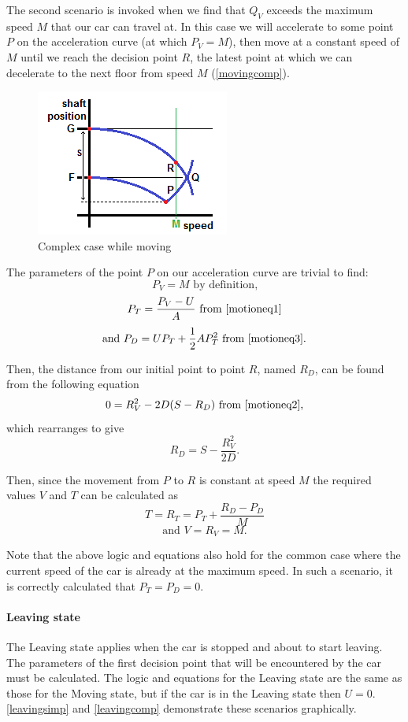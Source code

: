 \documentclass{UoYCSproject}
\begin{document}
The second scenario is invoked when we find that $Q_V$ exceeds the maximum speed $M$ that our car can travel at.  In this case we will accelerate to some point $P$ on the acceleration curve (at which $P_V=M$), then move at a constant speed of $M$ until we reach the decision point $R$, the latest point at which we can decelerate to the next floor from speed $M$ (\autoref{movingcomp}).

\begin{figure} [h]
	\centering
	\includegraphics{moving_comp.png}
	\caption{Complex case while moving}
	\label{movingcomp}
\end{figure}

The parameters of the point $P$ on our acceleration curve are trivial to find:
\[ P_V=M \text{ by definition,} \]
\[ P_T=\frac{P_V-U}{A} \text{ from \autoref{motioneq1}} \]
\[ \text{and } P_D=UP_T+\frac{1}{2}AP_T^2 \text{ from \autoref{motioneq3}.} \]

Then, the distance from our initial point to point $R$, named $R_D$, can be found from the following equation
\[ 0=R_V^2-2D(S-R_D) \text{ from \autoref{motioneq2},} \]
which rearranges to give
\[ R_D = S - \frac{R_V^2}{2D} \text{.} \]

Then, since the movement from $P$ to $R$ is constant at speed $M$ the required values $V$ and $T$ can be calculated as
\[ T = R_T = P_T+\frac{R_D-P_D}{M} \]
\[ \text{and } V = R_V = M \text{.} \]

Note that the above logic and equations also hold for the common case where the current speed of the car is already at the maximum speed.  In such a scenario, it is correctly calculated that $P_T=P_D=0$.

\paragraph{Leaving state}

The Leaving state applies when the car is stopped and about to start leaving.  The parameters of the first decision point that will be encountered by the car must be calculated.  The logic and equations for the Leaving state are the same as those for the Moving state, but if the car is in the Leaving state then $U=0$.  \autoref{leavingsimp} and \autoref{leavingcomp} demonstrate these scenarios graphically.
\end{document}
